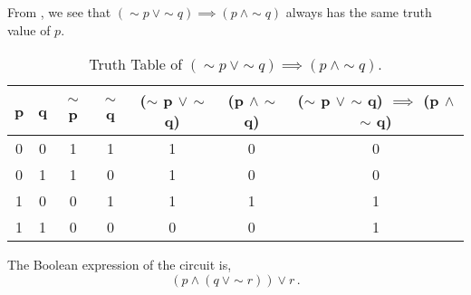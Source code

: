 %
%

\begin{subquestions}


\subquestion

From , we see that $(\sim p ~\lor \sim q) \implies (p ~\land \sim q)$ always has the same truth value of $p$.
\begin{table}[ht]
	\centering
	\begin{tabular}{|c|c|c|c|c|c|c|}
		\hline
		p & q & $\sim$ p & $\sim$ q & ($\sim$ p $\lor$ $\sim$ q) & (p $\land$ $\sim$ q) & ($\sim$ p $\lor$ $\sim$ q) $\implies$ (p $\land$ $\sim$ q) \\
		\hline
		0 & 0 & 1 & 1 & 1 & 0 & 0 \\
		0 & 1 & 1 & 0 & 1 & 0 & 0 \\
		1 & 0 & 0 & 1 & 1 & 1 & 1 \\
		1 & 1 & 0 & 0 & 0 & 0 & 1 \\
		\hline
	\end{tabular}
	\caption{\label{2011:q2:tab:TruthTab1} Truth Table of $(\sim p ~\lor \sim q) \implies (p ~\land \sim q)$.}
\end{table}


\subquestion

The Boolean expression of the circuit is,
\begin{equation}
	(p \land (q ~\lor \sim r)) \lor r\,.
\end{equation}



\end{subquestions}
